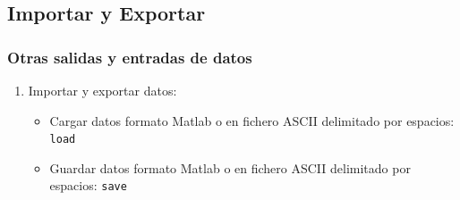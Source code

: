 \subsection{Importar y Exportar}
\begin{frame}[label=io_otras]
 \frametitle{Otras salidas y entradas de datos}
 \begin{enumerate}
  \item Importar y exportar datos:
  \begin{itemize}
    \item Cargar datos formato \alert{Matlab} o en fichero \alert{ASCII}
      delimitado por espacios: \alert{\texttt{load}}
    \item Guardar datos formato \alert{Matlab} o en fichero \alert{ASCII}
      delimitado por espacios: \alert{\texttt{save}}
  \end{itemize}
 \end{enumerate}
\end{frame}

